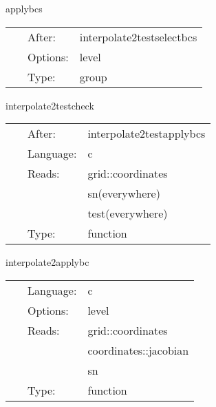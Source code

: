 \documentclass{article}
\begin{document}
\vspace{5mm}


\hspace{5mm} applybcs 

\hspace{5mm}{\it test: interpolate test grid function } 


\hspace{5mm}

 \begin{tabular*}{160mm}{cll} 
~ & After:  & interpolate2testselectbcs \\ 
~ & Options:  & level \\ 
~ & Type:  & group \\ 
\end{tabular*} 


\vspace{5mm}


\hspace{5mm} interpolate2testcheck 

\hspace{5mm}{\it test: check test grid function } 


\hspace{5mm}

 \begin{tabular*}{160mm}{cll} 
~ & After:  & interpolate2testapplybcs \\ 
~ & Language:  & c \\ 
~ & Reads:  & grid::coordinates \\ 
~& ~ &sn(everywhere)\\ 
~& ~ &test(everywhere)\\ 
~ & Type:  & function \\ 
\end{tabular*} 


\vspace{5mm}


\hspace{5mm} interpolate2applybc 

\hspace{5mm}{\it apply interpolating inter-patch boundaries } 


\hspace{5mm}

 \begin{tabular*}{160mm}{cll} 
~ & Language:  & c \\ 
~ & Options:  & level \\ 
~ & Reads:  & grid::coordinates \\ 
~& ~ &coordinates::jacobian\\ 
~& ~ &sn\\ 
~ & Type:  & function \\ 
\end{tabular*} 
\end{document}
